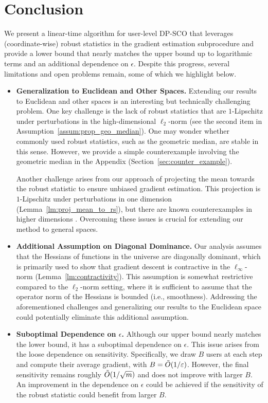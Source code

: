 \section{Conclusion}
\label{sec:discussion}

We present a linear-time algorithm for user-level DP-SCO that leverages (coordinate-wise) robust statistics in the gradient estimation subprocedure and provide a lower bound that nearly matches the upper bound up to logarithmic terms and an additional dependence on $\epsilon$. Despite this progress, several limitations and open problems remain, some of which we highlight below.

\begin{itemize}
    \item \textbf{Generalization to Euclidean and Other Spaces.}  
    Extending our results to Euclidean and other spaces is an interesting but technically challenging problem. One key challenge is the lack of robust statistics that are $1$-Lipschitz under perturbations in the high-dimensional $\ell_2$-norm (see the second item in Assumption~\ref{assum:prop_geo_median}).
    One may wonder whether commonly used robust statistics, such as the geometric median, are stable in this sense. However, we provide a simple counterexample involving the geometric median in the Appendix (Section~\ref{sec:counter_example}).  
    
    Another challenge arises from our approach of projecting the mean towards the robust statistic to ensure unbiased gradient estimation. This projection is $1$-Lipschitz under perturbations in one dimension (Lemma~\ref{lm:proj_mean_to_rs}), but there are known counterexamples in higher dimensions \cite[Lemma 16]{alt24}. Overcoming these issues is crucial for extending our method to general spaces.

    \item \textbf{ Additional Assumption on Diagonal Dominance.}  
    Our analysis assumes that the Hessians of functions in the universe are diagonally dominant, which is primarily used to show that gradient descent is contractive in the $\ell_\infty$-norm (Lemma~\ref{lm:contractivity}). This assumption is somewhat restrictive compared to the $\ell_2$-norm setting, where it is sufficient to assume that the operator norm of the Hessians is bounded (i.e., smoothness). Addressing the aforementioned challenges and generalizing our results to the Euclidean space could potentially eliminate this additional assumption.

    \item \textbf{ Suboptimal Dependence on $\epsilon$.}  
    Although our upper bound nearly matches the lower bound, it has a suboptimal dependence on $\epsilon$. This issue arises from the loose dependence on sensitivity. Specifically, we draw $B$ users at each step and compute their average gradient, with $B = \Tilde{O}(1/\epsilon)$. However, the final sensitivity remains roughly $\Tilde{O}(1/\sqrt{m})$ and does not improve with larger $B$. An improvement in the dependence on $\epsilon$ could be achieved if the sensitivity of the robust statistic could benefit from larger $B$.
\end{itemize}

